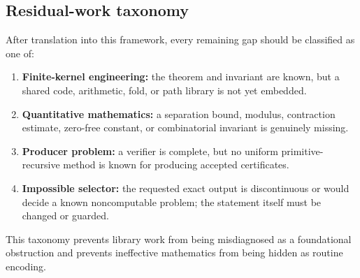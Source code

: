 \subsection{Residual-work taxonomy}

After translation into this framework, every remaining gap should be classified
as one of:

\begin{enumerate}[label=\textbf{R\arabic*.}]
\item \textbf{Finite-kernel engineering:} the theorem and invariant are known,
      but a shared code, arithmetic, fold, or path library is not yet embedded.
\item \textbf{Quantitative mathematics:} a separation bound, modulus,
      contraction estimate, zero-free constant, or combinatorial invariant is
      genuinely missing.
\item \textbf{Producer problem:} a verifier is complete, but no uniform
      primitive-recursive method is known for producing accepted certificates.
\item \textbf{Impossible selector:} the requested exact output is discontinuous
      or would decide a known noncomputable problem; the statement itself must
      be changed or guarded.
\end{enumerate}

This taxonomy prevents library work from being misdiagnosed as a foundational
obstruction and prevents ineffective mathematics from being hidden as routine
encoding.
